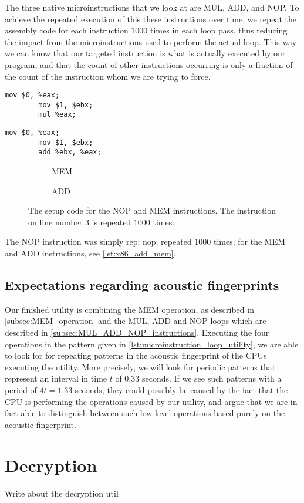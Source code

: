 The three native microinstructions that we look at are MUL, ADD, and NOP. 
To achieve the repeated execution of this these instructions over time, we repeat the assembly code for each instruction \(1000\) times in each loop pass, thus reducing the impact from the microinstructions used to perform the actual loop. 
This way we can know that our targeted instruction is what is actually executed by our program, and that the count of other instructions occurring is only a fraction of the count of the instruction whom we are trying to force.

\newsavebox{\MEMfigure}
	\begin{lrbox}{\MEMfigure}%
	\begin{lstlisting}[language={[x86masm]Assembler}]
		mov $0, %eax;
		mov $1, $ebx;
		mul %eax;
	\end{lstlisting}
\end{lrbox}

\newsavebox{\ADDfigure}
	\begin{lrbox}{\ADDfigure}%
	\begin{lstlisting}[language={[x86masm]Assembler}]
		mov $0, %eax;
		mov $1, $ebx;
		add %ebx, %eax;
	\end{lstlisting}
\end{lrbox}

\begin{figure}[h]
    \begin{subfigure}{0.5\textwidth}
        \centering
        \usebox{\MEMfigure}
        \caption{MEM}
    \end{subfigure}
    \begin{subfigure}{0.5\textwidth}
        \centering
        \usebox{\ADDfigure}
        \caption{ADD}
    \end{subfigure}
	\caption{The setup code for the NOP and MEM instructions. The instruction on line number 3 is repeated \(1000\) times.}
	\label{lst:x86_add_mem}
\end{figure}

The NOP instruction was simply rep; nop; repeated \(1000\) times; for the MEM and ADD instructions, see \autoref{lst:x86_add_mem}. 


\subsection{Expectations regarding acoustic fingerprints}

Our finished utility is combining the MEM operation, as described in \autoref{subsec:MEM_operation} and the MUL, ADD and NOP-loops which are described in \autoref{subsec:MUL_ADD_NOP_instructions}.
Executing the four operations in the pattern given in \autoref{lst:microinstruction_loop_utility}, we are able to look for for repeating patterns in the acoustic fingerprint of the CPUs executing the utility.
More precisely, we will look for periodic patterns that represent an interval in time \(t\) of \(0.33\) seconds. 
If we see such patterns with a period of \(4t = 1.33\) seconds, they could possibly be caused by the fact that the CPU is performing the operations caused by our utility, and argue that we are in fact able to distinguish between such low level operations based purely on the acoustic fingerprint. 


\section{Decryption}
Write about the decryption util

